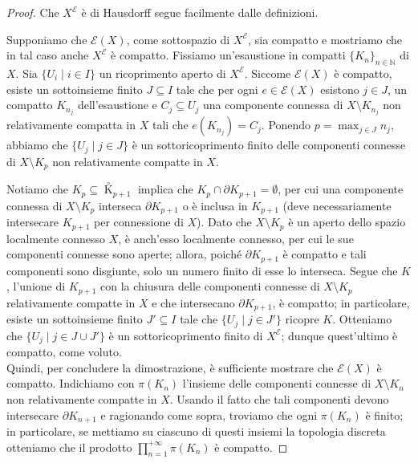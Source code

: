 \begin{proof}
    Che $X^\mathcal{E}$ è di Hausdorff segue facilmente dalle definizioni.
    
    Supponiamo che $\mathcal{E}(X)$, come sottospazio di $X^\mathcal{E}$, sia compatto e mostriamo che in tal caso anche $X^\mathcal{E}$ è compatto. Fissiamo un'esaustione in compatti $\{K_n\}_{n\in\mathbb{N}}$ di $X$. Sia $\{U_i\mid i\in I\}$ un ricoprimento aperto di $X^\mathcal{E}$. Siccome $\mathcal{E}(X)$ è compatto, esiste un sottoinsieme finito $J\subseteq I$ tale che per ogni $e\in\mathcal{E}(X)$ esistono $j\in J$, un compatto $K_{n_j}$ dell'esaustione e $C_j\subseteq U_j$ una componente connessa di $X\setminus K_{n_j}$ non relativamente compatta in $X$ tali che $e(K_{n_j})=C_j$. Ponendo $p=\displaystyle\max_{j\in J}n_j$, abbiamo che $\{U_j\mid j\in J\}$ è un sottoricoprimento finito delle componenti connesse di $X\setminus K_p$ non relativamente compatte in $X$.

    Notiamo che $K_p\subseteq{\mathop K\limits^ \circ}_{p+1}$ implica che $K_p\cap\partial K_{p+1}=\emptyset$, per cui una componente connessa di $X\setminus K_p$ interseca $\partial K_{p+1}$ o è inclusa in $K_{p+1}$ (deve necessariamente intersecare $K_{p+1}$ per connessione di $X$). Dato che $X\setminus K_p$ è un aperto dello spazio localmente connesso $X$, è anch'esso localmente connesso, per cui le sue componenti connesse sono aperte; allora, poiché $\partial K_{p+1}$ è compatto e tali componenti sono disgiunte, solo un numero finito di esse lo interseca. Segue che $K$, l'unione di $K_{p+1}$ con la chiusura delle componenti connesse di $X\setminus K_p$ relativamente compatte in $X$ e che intersecano $\partial K_{p+1}$, è compatto; in particolare, esiste un sottoinsieme finito $J'\subseteq I$ tale che $\{U_j\mid j\in J'\}$ ricopre $K$. Otteniamo che $\{U_j\mid j\in J\cup J'\}$ è un sottoricoprimento finito di $X^\mathcal{E}$; dunque quest'ultimo è compatto, come voluto.\\

    Quindi, per concludere la dimostrazione, è sufficiente mostrare che $\mathcal{E}(X)$ è compatto. Indichiamo con $\pi(K_n)$ l'insieme delle componenti connesse di $X\setminus K_n$ non relativamente compatte in $X$. Usando il fatto che tali componenti devono intersecare $\partial K_{n+1}$ e ragionando come sopra, troviamo che ogni $\pi(K_n)$ è finito; in particolare, se mettiamo su ciascuno di questi insiemi la topologia discreta otteniamo che il prodotto $\displaystyle\prod_{n=1}^{+\infty}\pi(K_n)$ è compatto.
    

\end{proof}
